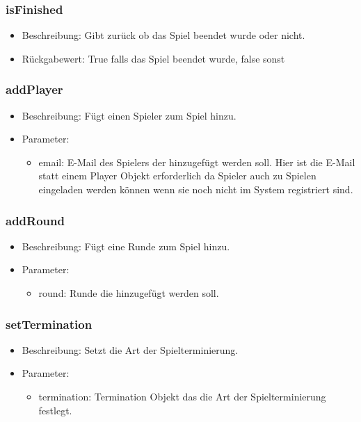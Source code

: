 \documentclass[a4paper]{scrreprt}
\begin{document}
	\subsubsection{isFinished}
	\begin{itemize}
		\item Beschreibung: Gibt zurück ob das Spiel beendet wurde oder nicht.
		\item Rückgabewert: True falls das Spiel beendet wurde, false sonst
	\end{itemize}

	\subsubsection{addPlayer}
	\begin{itemize}
		\item Beschreibung: Fügt einen Spieler zum Spiel hinzu.
		\item Parameter:
		\begin{itemize}
			\item email: E-Mail des Spielers der hinzugefügt werden soll.
			Hier ist die E-Mail statt einem Player Objekt erforderlich da Spieler auch zu Spielen eingeladen werden können wenn sie noch nicht im System registriert sind.
		\end{itemize}
	\end{itemize}

	\subsubsection{addRound}
	\begin{itemize}
		\item Beschreibung: Fügt eine Runde zum Spiel hinzu.
		\item Parameter:
		\begin{itemize}
			\item round: Runde die hinzugefügt werden soll.
		\end{itemize}
	\end{itemize}

	\subsubsection{setTermination}
	\begin{itemize}
		\item Beschreibung: Setzt die Art der Spielterminierung.
		\item Parameter:
		\begin{itemize}
			\item termination: Termination Objekt das die Art der Spielterminierung festlegt.
		\end{itemize}
	\end{itemize}
\end{document}
